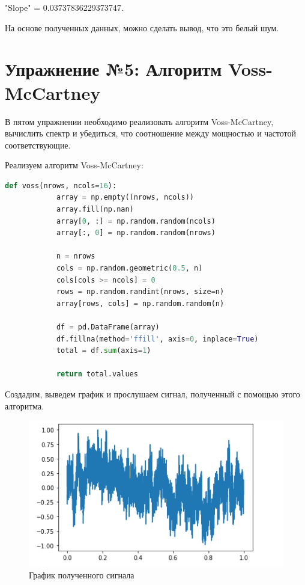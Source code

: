 \documentclass[a4paper, 14pt]{extarticle}
\begin{document}
    "Slope" = 0.03737836229373747.

    На основе полученных данных, можно сделать вывод, что это белый шум.

    \newpage


    \section{Упражнение №5: Алгоритм Voss-McCartney}
    \label{sec:5}

    В пятом упражнении необходимо реализовать алгоритм Voss-McCartney, вычислить спектр и убедиться, что соотношение между мощностью и частотой соответствующие.

    Реализуем алгоритм Voss-McCartney:

    \begin{lstlisting}[language=Python, caption= Алгоритм Voss-McCartney, label={lst:alg_voss_mccartney}]
        def voss(nrows, ncols=16):
            array = np.empty((nrows, ncols))
            array.fill(np.nan)
            array[0, :] = np.random.random(ncols)
            array[:, 0] = np.random.random(nrows)

            n = nrows
            cols = np.random.geometric(0.5, n)
            cols[cols >= ncols] = 0
            rows = np.random.randint(nrows, size=n)
            array[rows, cols] = np.random.random(n)

            df = pd.DataFrame(array)
            df.fillna(method='ffill', axis=0, inplace=True)
            total = df.sum(axis=1)

            return total.values
    \end{lstlisting}

    Создадим, выведем график и прослушаем сигнал, полученный с помощью этого алгоритма.

    \begin{figure}[H]
        \centering
        \includegraphics[width=0.8\linewidth]{voss_wave}
        \caption{График полученного сигнала}
        \label{fig:voss_wave}
    \end{figure}
\end{document}
